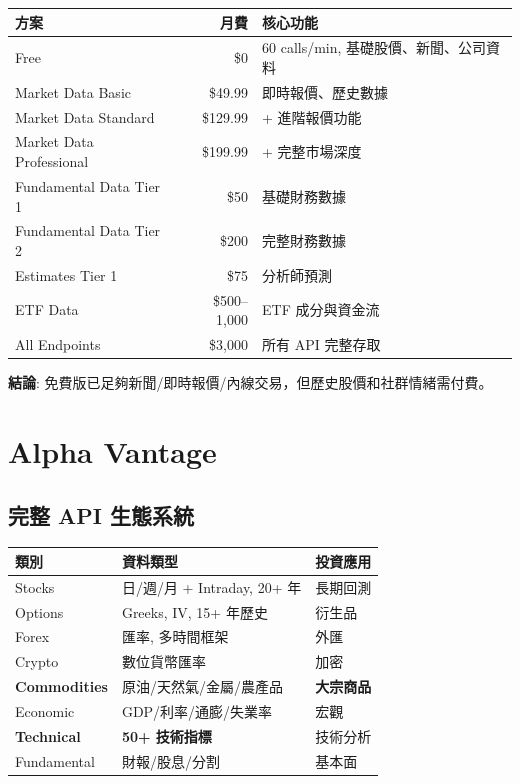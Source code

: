 \documentclass[11pt,a4paper]{article}
\begin{document}
\begin{table}[H]
\centering
\small
\begin{tabular}{@{}lrl@{}}
\toprule
\textbf{方案} & \textbf{月費} & \textbf{核心功能} \\
\midrule
Free & \$0 & 60 calls/min, 基礎股價、新聞、公司資料 \\
Market Data Basic & \$49.99 & 即時報價、歷史數據 \\
Market Data Standard & \$129.99 & + 進階報價功能 \\
Market Data Professional & \$199.99 & + 完整市場深度 \\
Fundamental Data Tier 1 & \$50 & 基礎財務數據 \\
Fundamental Data Tier 2 & \$200 & 完整財務數據 \\
Estimates Tier 1 & \$75 & 分析師預測 \\
ETF Data & \$500--1,000 & ETF 成分與資金流 \\
All Endpoints & \$3,000 & 所有 API 完整存取 \\
\bottomrule
\end{tabular}
\end{table}

\textbf{結論}: 免費版已足夠新聞/即時報價/內線交易，但歷史股價和社群情緒需付費。

\newpage
\section{Alpha Vantage}

\subsection{完整 API 生態系統}

\begin{table}[H]
\centering
\begin{tabular}{@{}lll@{}}
\toprule
\textbf{類別} & \textbf{資料類型} & \textbf{投資應用} \\
\midrule
Stocks & 日/週/月 + Intraday, 20+ 年 & 長期回測 \\
Options & Greeks, IV, 15+ 年歷史 & 衍生品 \\
Forex & 匯率, 多時間框架 & 外匯 \\
Crypto & 數位貨幣匯率 & 加密 \\
\textbf{Commodities} & 原油/天然氣/金屬/農產品 & \textbf{大宗商品} \\
Economic & GDP/利率/通膨/失業率 & 宏觀 \\
\textbf{Technical} & \textbf{50+ 技術指標} & 技術分析 \\
Fundamental & 財報/股息/分割 & 基本面 \\
\bottomrule
\end{tabular}
\end{table}
\end{document}
